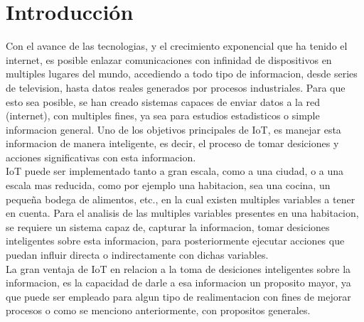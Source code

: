 \chapter{Introducción}


Con el avance de las tecnologias, y el crecimiento exponencial que ha tenido el internet, es posible enlazar comunicaciones con infinidad de dispositivos en multiples lugares del mundo, accediendo a todo tipo de informacion, desde series de television, hasta datos reales generados por procesos industriales. Para que esto sea posible, se han creado sistemas capaces de enviar datos a la red (internet), con multiples fines, ya sea para estudios estadisticos o simple informacion general. Uno de los objetivos principales de IoT, es manejar esta informacion de manera inteligente, es decir, el proceso de tomar desiciones y acciones significativas con esta informacion.\\

IoT puede ser implementado tanto a gran escala, como a una ciudad, o a una escala mas reducida, como por ejemplo una habitacion, sea una cocina, un pequeña bodega de alimentos, etc., en la cual existen multiples variables a tener en cuenta. Para el analisis de las multiples variables presentes en una habitacion, se requiere un sistema capaz de, capturar la informacion, tomar desiciones inteligentes sobre esta informacion, para posteriormente ejecutar acciones que puedan influir directa o indirectamente con dichas variables. \\

La gran ventaja de IoT en relacion a la toma de desiciones inteligentes sobre la informacion, es la capacidad de darle a esa informacion un proposito mayor, ya que puede ser empleado para algun tipo de realimentacion con fines de mejorar procesos o como se menciono anteriormente, con propositos generales. \\